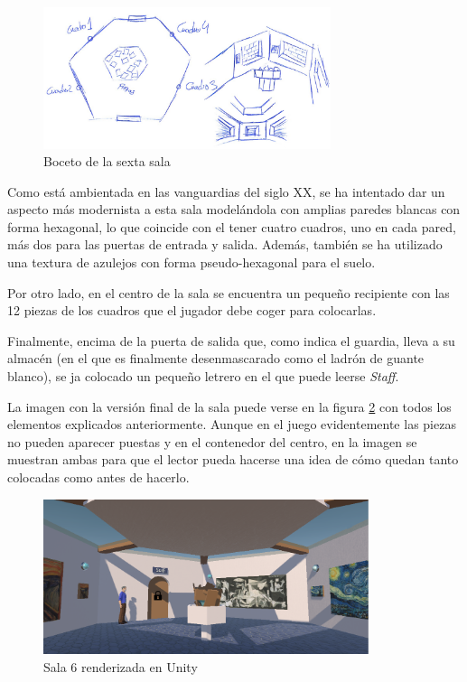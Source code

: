 \begin{figure}[!h]
\begin{center}
\includegraphics[width=0.75\textwidth]{imagenes/7/bocetos/boceto-sala-6.png}
\caption{Boceto de la sexta sala}
\label{fig:boceto-sala-6}
\end{center}
\end{figure}

Como está ambientada en las vanguardias del siglo XX, se ha intentado dar un aspecto más modernista a esta sala modelándola con amplias paredes blancas con forma hexagonal, lo que coincide con el tener cuatro cuadros, uno en cada pared, más dos para las puertas de entrada y salida. Además, también se ha utilizado una textura de azulejos con forma pseudo-hexagonal para el suelo. 

Por otro lado, en el centro de la sala se encuentra un pequeño recipiente con las 12 piezas de los cuadros que el jugador debe coger para colocarlas.

Finalmente, encima de la puerta de salida que, como indica el guardia, lleva a su almacén (en el que es finalmente desenmascarado como el ladrón de guante blanco), se ja colocado un pequeño letrero en el que puede leerse \textit{Staff}.

La imagen con la versión final de la sala puede verse en la figura \ref{fig:unity-sala-6} con todos los elementos explicados anteriormente. Aunque en el juego evidentemente las piezas no pueden aparecer puestas y en el contenedor del centro, en la imagen se muestran ambas para que el lector pueda hacerse una idea de cómo quedan tanto colocadas como antes de hacerlo.

\begin{figure}[!h]
\begin{center}
\includegraphics[width=0.85\textwidth]{imagenes/7/salas-unity/unity-sala-6.png}
\caption{Sala 6 renderizada en Unity}
\label{fig:unity-sala-6}
\end{center}
\end{figure}

